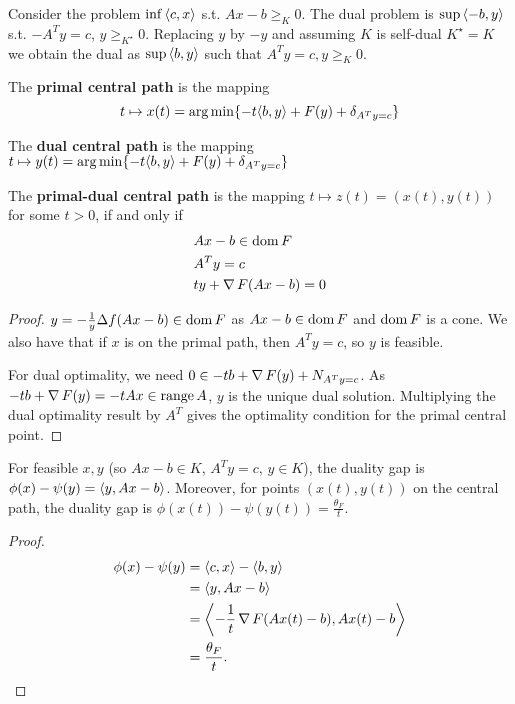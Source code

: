 \begin{thm}
  \label{sec:inter-point-meth-3}
  Consider the problem $\inf \IP{c, x}$ s.t. $Ax - b \geq_{K} 0$. The
  dual problem is $\sup \IP{-b, y}$ s.t. $-A^{T} y = c$, $y
  \geq_{K^{\star}} 0$.  Replacing $y$ by $-y$ and assuming $K$ is
  self-dual $K^{\star} = K$ we obtain the dual as $\sup \IP{b, y}$
  such that $A^{T} y = c, y \geq_{K} 0$.

  The \textbf{primal central path} is the mapping
  \begin{equation}
    t \mapsto x(t) = \argmin \{ -t \IP{b, y} + F(y) + \delta_{A^{T}y = c} \}
  \end{equation}

  The \textbf{dual central path} is the mapping $t \mapsto y(t) =
  \argmin \{ -t \IP{b, y} + F(y) + \delta_{A^{T}y = c} \} $

  The \textbf{primal-dual central path} is the mapping $t \mapsto z(t)
  = (x(t), y(t))$ for some $t > 0$, if and only if
  \begin{align}
    \label{eq:52}
    &Ax - b \in \operatorname*{dom} F \\
    \label{eq:53}
    &A^{T} y = c \\
    \label{eq:54}
    &ty + \operatorname{\nabla} F(Ax - b) = 0
  \end{align}
\end{thm}

\begin{proof}
  $y = -\frac{1}{y} \Delta f(Ax - b) \in \operatorname*{dom} F$ as $Ax - b \in \operatorname*{dom}
  F$ and $\operatorname*{dom} F$ is a cone.  We also have that if $x$ is on the primal path,
  then $A^{T} y = c$, so $y$ is feasible.

  For dual optimality, we need $0 \in -tb + \operatorname{\nabla} F(y) + N_{A^{T} y =
    c}$. As $-tb + \operatorname{\nabla} F(y) = -tAx \in \operatorname*{range} A$, $y$ is the unique
  dual solution.  Multiplying the dual optimality result by $A^{T}$
  gives the optimality condition for the primal central point.
\end{proof}

\begin{thm}
  \label{sec:inter-point-meth-4}
  For feasible $x, y$ (so $Ax - b \in K$, $A^{T}y = c$, $y \in K$),
  the duality gap is $\phi(x) - \psi(y) = \IP{y, Ax - b}$.  Moreover,
  for points $(x(t), y(t))$ on the central path, the duality gap is
  $\phi(x(t)) - \psi(y(t)) = \frac{\theta_{F}}{t}$.
\end{thm}

\begin{proof}
  \begin{align}
    \phi(x) - \psi(y) &= \IP{c, x} - \IP{b, y} \\
    &= \IP{y, Ax - b} \\
    &= \IP{-\frac{1}{t} \grad F(Ax(t) - b), Ax(t) - b} \\
    &= \frac{\theta_{F}}{t}.
  \end{align}
\end{proof}

